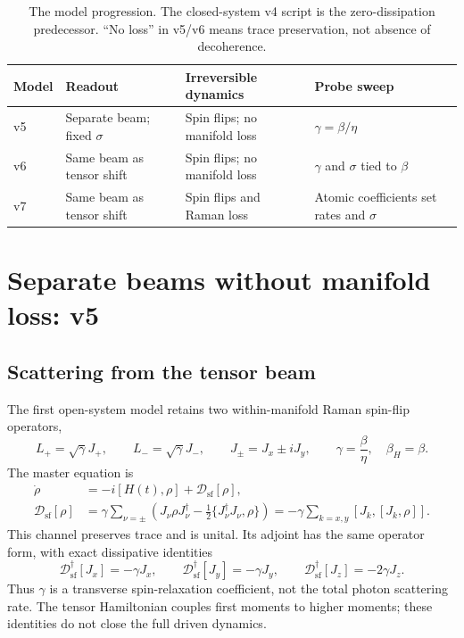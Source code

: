 \documentclass[11pt]{article}
\newcommand{\Dsf}{\mathcal{D}_{\mathrm{sf}}}
\begin{document}
\begin{table}[htbp]
\centering
\begin{tabularx}{\textwidth}{@{}lXXX@{}}
\toprule
Model & Readout & Irreversible dynamics & Probe sweep \\
\midrule
v5 & Separate beam; fixed $\sigma$ & Spin flips; no manifold loss & $\gamma=\beta/\eta$ \\
v6 & Same beam as tensor shift & Spin flips; no manifold loss & $\gamma$ and $\sigma$ tied to $\beta$ \\
v7 & Same beam as tensor shift & Spin flips and Raman loss & Atomic coefficients set rates and $\sigma$ \\
\bottomrule
\end{tabularx}
\caption{The model progression. The closed-system v4 script is the
zero-dissipation predecessor. ``No loss'' in v5/v6 means trace preservation,
not absence of decoherence.}
\end{table}

\section{Separate beams without manifold loss: v5}
\label{sec:separate}

\subsection{Scattering from the tensor beam}

The first open-system model retains two within-manifold Raman spin-flip operators,
\begin{equation}
 L_+=\sqrt{\gamma}J_+,\qquad L_-=\sqrt{\gamma}J_-,\qquad
 J_\pm=J_x\pm iJ_y,\qquad \gamma=\frac{\beta}{\eta},\quad \beta_H=\beta.
 \label{eq:jumps}
\end{equation}
The master equation is
\begin{align}
 \dot\rho&=-i[H(t),\rho]+\Dsf[\rho],\\
 \Dsf[\rho]&=\gamma\sum_{\nu=\pm}
 \left(J_\nu\rho J_\nu^\dagger-\tfrac12\{J_\nu^\dagger J_\nu,\rho\}\right)
 =-\gamma\sum_{k=x,y}[J_k,[J_k,\rho]].
 \label{eq:sf}
\end{align}
This channel preserves trace and is unital. Its adjoint has the same operator
form, with exact dissipative identities
\begin{equation}
 \Dsf^\dagger[J_x]=-\gamma J_x,\qquad
 \Dsf^\dagger[J_y]=-\gamma J_y,\qquad
 \Dsf^\dagger[J_z]=-2\gamma J_z.
 \label{eq:relaxation}
\end{equation}
Thus $\gamma$ is a transverse spin-relaxation coefficient, not the total photon
scattering rate. The tensor Hamiltonian couples first moments to higher moments;
these identities do not close the full driven dynamics.
\end{document}
